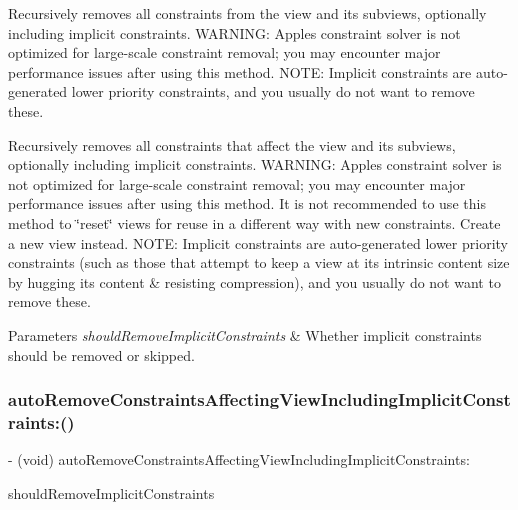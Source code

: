Recursively removes all constraints from the view and its subviews, optionally including implicit constraints. W\+A\+R\+N\+I\+NG\+: Apple\textquotesingle{}s constraint solver is not optimized for large-\/scale constraint removal; you may encounter major performance issues after using this method. N\+O\+TE\+: Implicit constraints are auto-\/generated lower priority constraints, and you usually do not want to remove these.

Recursively removes all constraints that affect the view and its subviews, optionally including implicit constraints. W\+A\+R\+N\+I\+NG\+: Apple\textquotesingle{}s constraint solver is not optimized for large-\/scale constraint removal; you may encounter major performance issues after using this method. It is not recommended to use this method to \char`\"{}reset\char`\"{} views for reuse in a different way with new constraints. Create a new view instead. N\+O\+TE\+: Implicit constraints are auto-\/generated lower priority constraints (such as those that attempt to keep a view at its intrinsic content size by hugging its content \& resisting compression), and you usually do not want to remove these.


\begin{DoxyParams}{Parameters}
{\em should\+Remove\+Implicit\+Constraints} & Whether implicit constraints should be removed or skipped. \\
\hline
\end{DoxyParams}
\mbox{\label{category_u_i_view_07_auto_layout_08_a8ef3d82eac5c95945a96b6cca523484f}} 
\subsubsection{\texorpdfstring{auto\+Remove\+Constraints\+Affecting\+View\+Including\+Implicit\+Constraints\+:()}{autoRemoveConstraintsAffectingViewIncludingImplicitConstraints:()}}
{\footnotesize\ttfamily -\/ (void) auto\+Remove\+Constraints\+Affecting\+View\+Including\+Implicit\+Constraints\+: \begin{DoxyParamCaption}\item[{(B\+O\+OL)}]{should\+Remove\+Implicit\+Constraints }\end{DoxyParamCaption}}

